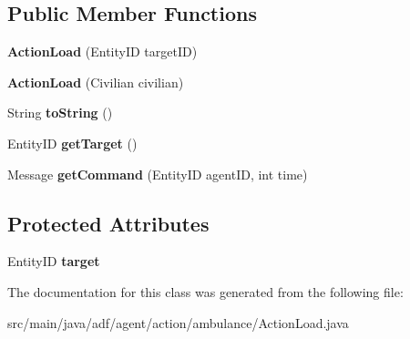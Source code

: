 \subsection*{Public Member Functions}
\begin{DoxyCompactItemize}
\item 
\hypertarget{classadf_1_1agent_1_1action_1_1ambulance_1_1ActionLoad_afb8c917e4bdfcef0e6083e3c89709aa7}{}\label{classadf_1_1agent_1_1action_1_1ambulance_1_1ActionLoad_afb8c917e4bdfcef0e6083e3c89709aa7} 
{\bfseries Action\+Load} (Entity\+ID target\+ID)
\item 
\hypertarget{classadf_1_1agent_1_1action_1_1ambulance_1_1ActionLoad_a5dedd5ce60d85b8dfc1ed698b59f9927}{}\label{classadf_1_1agent_1_1action_1_1ambulance_1_1ActionLoad_a5dedd5ce60d85b8dfc1ed698b59f9927} 
{\bfseries Action\+Load} (Civilian civilian)
\item 
\hypertarget{classadf_1_1agent_1_1action_1_1ambulance_1_1ActionLoad_abef023f9c55eced92f5c1f6b99cd76a1}{}\label{classadf_1_1agent_1_1action_1_1ambulance_1_1ActionLoad_abef023f9c55eced92f5c1f6b99cd76a1} 
String {\bfseries to\+String} ()
\item 
\hypertarget{classadf_1_1agent_1_1action_1_1ambulance_1_1ActionLoad_a01c6dcdb32d5b04b355a52c74fcab728}{}\label{classadf_1_1agent_1_1action_1_1ambulance_1_1ActionLoad_a01c6dcdb32d5b04b355a52c74fcab728} 
Entity\+ID {\bfseries get\+Target} ()
\item 
\hypertarget{classadf_1_1agent_1_1action_1_1ambulance_1_1ActionLoad_a28c77b2dc4e23671af98d958c39988c9}{}\label{classadf_1_1agent_1_1action_1_1ambulance_1_1ActionLoad_a28c77b2dc4e23671af98d958c39988c9} 
Message {\bfseries get\+Command} (Entity\+ID agent\+ID, int time)
\end{DoxyCompactItemize}
\subsection*{Protected Attributes}
\begin{DoxyCompactItemize}
\item 
\hypertarget{classadf_1_1agent_1_1action_1_1ambulance_1_1ActionLoad_a6146d26a2100734e0794bc4dfa408a24}{}\label{classadf_1_1agent_1_1action_1_1ambulance_1_1ActionLoad_a6146d26a2100734e0794bc4dfa408a24} 
Entity\+ID {\bfseries target}
\end{DoxyCompactItemize}


The documentation for this class was generated from the following file\+:\begin{DoxyCompactItemize}
\item 
src/main/java/adf/agent/action/ambulance/Action\+Load.\+java\end{DoxyCompactItemize}
